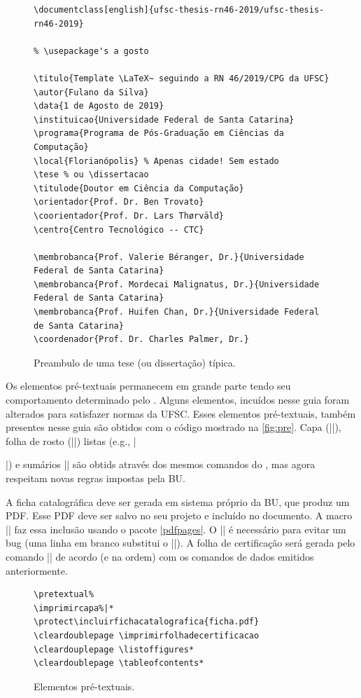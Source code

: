 \documentclass[embeddedlogo]{../ufsc-thesis-rn46-2019}
\begin{document}
\begin{figure}[tb]
  \centering
  \caption{Preambulo de uma tese (ou dissertação) típica.}
  \label{fig:preambulo}
  \begin{verbatim}
\documentclass[english]{ufsc-thesis-rn46-2019/ufsc-thesis-rn46-2019}

% \usepackage's a gosto

\titulo{Template \LaTeX~ seguindo a RN 46/2019/CPG da UFSC}
\autor{Fulano da Silva}
\data{1 de Agosto de 2019}
\instituicao{Universidade Federal de Santa Catarina}
\programa{Programa de Pós-Graduação em Ciências da Computação}
\local{Florianópolis} % Apenas cidade! Sem estado
\tese % ou \dissertacao
\titulode{Doutor em Ciência da Computação}
\orientador{Prof. Dr. Ben Trovato}
\coorientador{Prof. Dr. Lars Thørväld}
\centro{Centro Tecnológico -- CTC}

\membrobanca{Prof. Valerie Béranger, Dr.}{Universidade Federal de Santa Catarina}
\membrobanca{Prof. Mordecai Malignatus, Dr.}{Universidade Federal de Santa Catarina}
\membrobanca{Prof. Huifen Chan, Dr.}{Universidade Federal de Santa Catarina}
\coordenador{Prof. Dr. Charles Palmer, Dr.}
  \end{verbatim}
\end{figure}

Os elementos pré-textuais permanecem em grande parte tendo seu comportamento determinado pelo \abnTeX. Alguns elementos, incuídos nesse guia foram alterados para satisfazer normas da UFSC. Esses elementos pré-textuais, também presentes nesse guia são obtidos com o código mostrado na \autoref{fig:pre}. Capa (\mt|\imprimircapa|), folha de rosto (\mt|\imprimirfolhaderosto*|) listas (e.g., \mt|\listoffigures*|) e sumários \mt|\tableofcontents*| são obtids através dos mesmos comandos do \abnTeX, mas agora respeitam novas regras impostas pela BU. 

A ficha catalográfica deve ser gerada em sistema próprio da BU, que produz um PDF. Esse PDF deve ser salvo no seu projeto e incluído no documento. A macro \mt|| faz essa inclusão usando o pacote \href{https://www.ctan.org/pkg/pdfpages}{\mt|pdfpages|}. O \mt|\protect| é necessário para evitar um bug (uma linha em branco substitui o \mt|\protect|). A folha de certificação será gerada pelo comando \mt|\imprimirfolhadecertificacao| de acordo (e na ordem) com os comandos de dados emitidos anteriormente.

\begin{figure}[tb]
  \centering
  \caption{Elementos pré-textuais.}
  \label{fig:pre}
  \begin{verbatim}
\pretextual%
\imprimircapa%|*
\protect\incluirfichacatalografica{ficha.pdf}
\cleardoublepage \imprimirfolhadecertificacao
\cleardouplepage \listoffigures*
\cleardoublepage \tableofcontents*
  \end{verbatim}
\end{figure}
\end{document}
